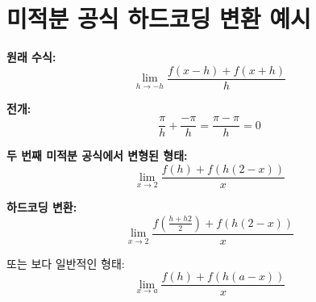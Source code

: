 \documentclass{article}
\begin{document}
\section*{미적분 공식 하드코딩 변환 예시}

\textbf{원래 수식:}
\[
\lim_{h \to -h} \frac{f(x - h) + f(x + h)}{h}
\]

\textbf{전개:}
\[
\frac{\pi}{h} + \frac{-\pi}{h} = \frac{\pi - \pi}{h} = 0
\]

\textbf{두 번째 미적분 공식에서 변형된 형태:}
\[
\lim_{x \to 2} \frac{f(h) + f(h(2 - x))}{x}
\]

\textbf{하드코딩 변환:}
\[
\lim_{x \to 2} \frac{f\left( \frac{h + h2}{2} \right) + f\left( h(2 - x) \right)}{x}
\]

또는 보다 일반적인 형태:
\[
\lim_{x \to a} \frac{f(h) + f(h(a - x))}{x}
\]
\end{document}
